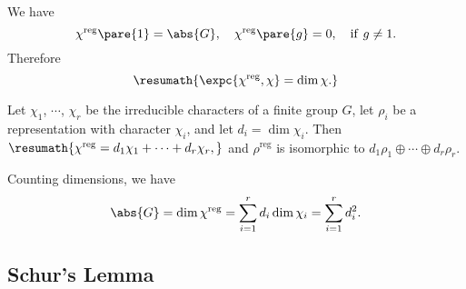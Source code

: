 \documentclass[hidelinks]{article}
\begin{document}
We have
\[ \chi^{\mathrm{reg}}\pare{1} = \abs{G},\quad \chi^{\mathrm{reg}}\pare{g} = 0,\quad \mathrm{if\ } g\neq 1. \]
Therefore
\[ \resumath{\expc{\chi^{\mathrm{reg}},\chi} = \dim \chi.} \]
\begin{corollary}
    Let $\chi_1$, $\cdots$, $\chi_r$ be the irreducible characters of a finite group $G$, let $\rho_i$ be a representation with character $\chi_i$, and let $d_i = \dim \chi_i$. Then $\resumath{\chi^{\mathrm{reg}} = d_1\chi_1 + \cdots + d_r\chi_r,}$ and $\rho^{\mathrm{reg}}$ is isomorphic to $d_1\rho_1 \oplus \cdots \oplus d_r\rho_r$.
\end{corollary}
Counting dimensions, we have
\[ \abs{G} = \dim \chi^{\mathrm{reg}} = \sum_{i=1}^r d_i \dim \chi_i = \sum_{i=1}^r d_i^2. \]


\subsection{Schur's Lemma} %
\label{sub:schur_s_lemma}
\end{document}
